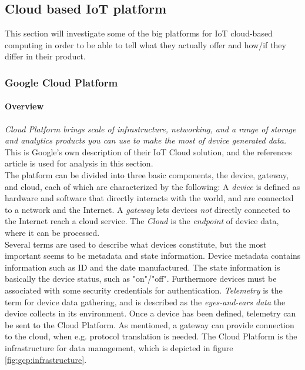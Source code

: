 \subsection{Cloud based IoT platform}
\label{iot_platforms}
This section will investigate some of the big platforms for IoT cloud-based computing in order to be able to tell what they actually offer and how/if they differ in their product. 

\subsubsection{Google Cloud Platform}
\paragraph{Overview} 
\textit{Cloud Platform brings scale of infrastructure, networking, and a range of storage and analytics products you can use to make the most of device generated data.}\cite{website:gcp}
This is Google's own description of their IoT Cloud solution, and the references article is used for analysis in this section. \\

The platform can be divided into three basic components, the device, gateway, and cloud, each of which are characterized by the following: A \textit{device} is defined as hardware and software that directly interacts with the world, and are connected to a network and the Internet. A \textit{gateway} lets devices \textit{not} directly connected to the Internet reach a cloud service. The \textit{Cloud} is the \textit{endpoint} of device data, where it can be processed.\\

Several terms are used to describe what devices constitute, but the most important seems to be metadata and state information. Device metadata contains information such as ID and the date manufactured. The state information is basically the device status, such as "on"/"off". Furthermore devices must be associated with some security credentials for authentication. \textit{Telemetry} is the term for device data gathering, and is described as the \textit{eyes-and-ears data} the device collects in its environment. Once a device has been defined, telemetry can be sent to the Cloud Platform. As mentioned, a gateway can provide connection to the cloud, when e.g. protocol translation is needed. The Cloud Platform is the infrastructure for data management, which is depicted in figure \ref{fig:gcp:infrastructure}.

